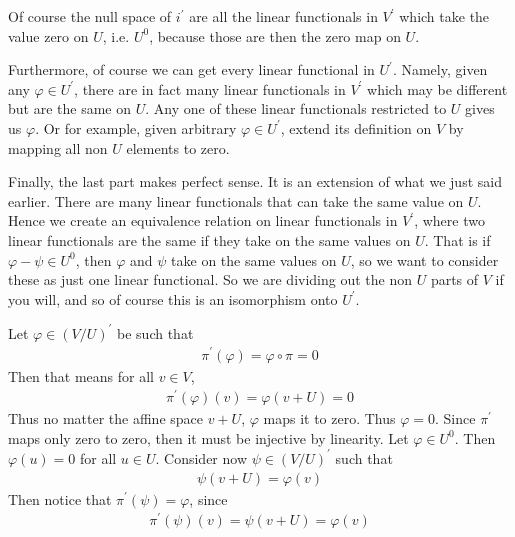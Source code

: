 \documentclass{book}
\begin{document}
\begin{enumerate}[label=\arabic*)]
      Of course the null space of $i^{\prime}$ are all the linear functionals in $V^{\prime}$ which take the value zero on $U$, i.e. $U^0$, because those are then the zero map on $U$.

      Furthermore, of course we can get every linear functional in $U^{\prime}$. Namely, given any $\varphi \in U^{\prime}$, there are in fact many linear functionals in $V^{\prime}$ which
      may be different but are the same on $U$. Any one of these linear functionals restricted to $U$ gives us $\varphi$. Or for example, given arbitrary $\varphi \in U^{\prime}$, extend its
      definition on $V$ by mapping all non $U$ elements to zero. 

      Finally, the last part makes perfect sense. It is an extension of what we just said earlier. There are many linear functionals that can take the same value on $U$. Hence we create an
      equivalence relation on linear functionals in $V^{\prime}$, where two linear functionals are the same if they take on the same values on $U$. That is if $\varphi - \psi \in U^0$, then
      $\varphi$ and $\psi$ take on the same values on $U$, so we want to consider these as just one linear functional. So we are dividing out the non $U$ parts of $V$ if you will, and so of
      course this is an isomorphism onto $U^{\prime}$.
    \ii
      \begin{enumerate}[label=\alph*)]
        \ii 
          Let $\varphi \in (V/U)^{\prime}$ be such that
          \begin{align*}
            \pi^{\prime}(\varphi) = \varphi \circ \pi = 0
          \end{align*}
          Then that means for all $v \in V$,
          \begin{align*}
            \pi^{\prime}(\varphi)(v) = \varphi(v + U) = 0
          \end{align*}
          Thus no matter the affine space $v + U$, $\varphi$ maps it to zero. Thus $\varphi = 0$. Since $\pi^{\prime}$ maps only zero to zero, then it must be injective by linearity. 
        \ii
          Let $\varphi \in U^0$. Then $\varphi(u) = 0$ for all $u \in U$. Consider now $\psi \in (V/U)^{\prime}$ such that 
          \begin{align*}
            \psi(v + U) = \varphi(v)
          \end{align*}
          Then notice that $\pi^{\prime}(\psi) = \varphi$, since
          \begin{align*}
            \pi^{\prime}(\psi)(v) = \psi(v + U) = \varphi(v)
          \end{align*}

\end{enumerate}
\end{enumerate}
\end{document}
